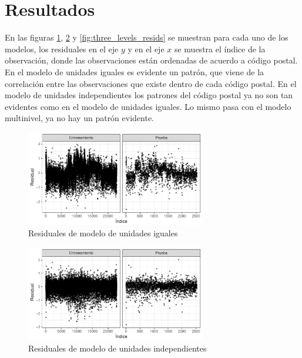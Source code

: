 
\section{Resultados}
\label{sec:resultados}

En las figuras \ref{fig:comp_pooling_resids}, \ref{fig:no_pooling_resids} y \ref{fig:three_levels_resids} se muestran para cada uno de los modelos, los residuales en el eje $y$ y en el eje $x$ se muestra el índice de la observación, donde las observaciones están ordenadas de acuerdo a código postal. En el modelo de unidades iguales es evidente un patrón, que viene de la correlación entre las observaciones que existe dentro de cada código postal. En el modelo de unidades independientes los patrones del código postal ya no son tan evidentes como en el modelo de unidades iguales. Lo mismo pasa con el modelo multinivel, ya no hay un patrón evidente.

\begin{figure}[H]
    \centering
    \includegraphics[width=0.7\textwidth]{images/comp_pooling_resids.pdf}
    \caption{Residuales de modelo de unidades iguales}
    \label{fig:comp_pooling_resids}
\end{figure}

\begin{figure}[H]
    \centering
    \includegraphics[width=0.7\textwidth]{images/no_pooling_resids.pdf}
    \caption{Residuales de modelo de unidades independientes}
    \label{fig:no_pooling_resids}
\end{figure}

